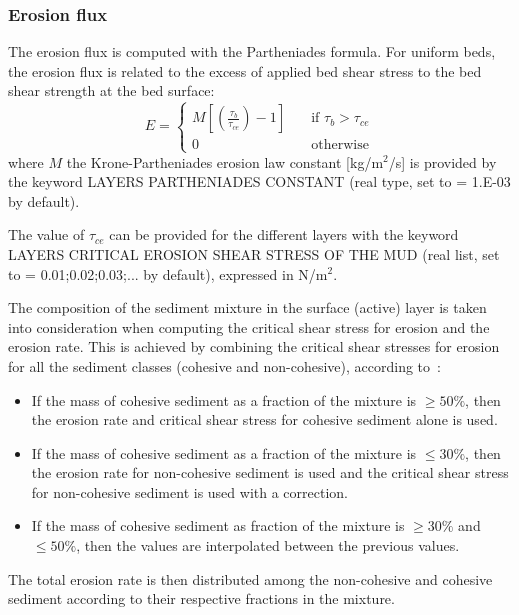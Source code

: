 \subsubsection{Erosion flux}
The erosion flux is computed with the Partheniades formula. For uniform beds, the erosion flux is related to the excess of
applied bed shear stress to the bed shear strength at the bed surface:
\begin{equation*}
E = \left\{\begin{array}{ll}
M\left[\left(\frac{\tau_b}{\tau_{ce}}\right)-1\right]\quad & \text{if}\,\,\tau_b> \tau_{ce}\\
0\quad & \text{otherwise}
\end{array}
\right.
\end{equation*}
where $M$ the Krone-Partheniades erosion law constant [kg/m$^2$/s] is provided by the keyword {\ttfamily LAYERS PARTHENIADES CONSTANT} (real type, set to {\ttfamily = 1.E-03} by default).

The value of $\tau_{ce}$ can be provided for the different layers with the keyword {\ttfamily LAYERS CRITICAL EROSION SHEAR STRESS OF THE MUD} (real list, set to {\ttfamily = 0.01;0.02;0.03;...} by default), expressed in N/m$^2$.

The composition of the sediment mixture in the surface (active) layer is taken into consideration when computing the critical shear stress for erosion and the erosion rate. This is achieved by combining the critical shear stresses for erosion for all the sediment classes (cohesive and non-cohesive), according to~\cite{LEHIR2011S135}:
\begin{itemize}
    \item If the mass of cohesive sediment as a fraction of the mixture is $\geq 50\%$, then the erosion rate and critical shear stress for cohesive sediment alone is used. %
    \item If the mass of cohesive sediment as a fraction of the mixture is $\leq 30\%$, then the erosion rate for non-cohesive sediment is used and the critical shear stress for non-cohesive sediment is used with a correction.
    \item If the mass of cohesive sediment as fraction of the mixture is $\geq 30\%$ and $\leq 50\%$, then the values are interpolated between the previous values.
\end{itemize}
The total erosion rate is then distributed among the non-cohesive and cohesive sediment according to their respective fractions in the mixture.

